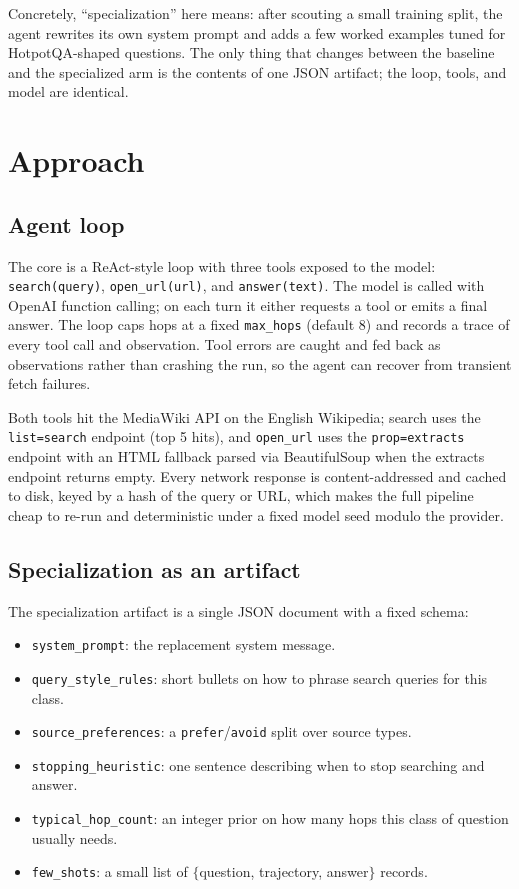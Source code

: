 \documentclass[11pt,a4paper]{article}
\begin{document}
Concretely, ``specialization'' here means: after scouting a small training
split, the agent rewrites its own system prompt and adds a few worked
examples tuned for HotpotQA-shaped questions. The only thing that changes
between the baseline and the specialized arm is the contents of one JSON
artifact; the loop, tools, and model are identical.

\section{Approach}

\subsection{Agent loop}

The core is a ReAct-style loop with three tools exposed to the model:
\texttt{search(query)}, \texttt{open\_url(url)}, and \texttt{answer(text)}.
The model is called with OpenAI function calling; on each turn it either
requests a tool or emits a final answer. The loop caps hops at a fixed
\texttt{max\_hops} (default 8) and records a trace of every tool call and
observation. Tool errors are caught and fed back as observations rather
than crashing the run, so the agent can recover from transient fetch
failures.

Both tools hit the MediaWiki API on the English Wikipedia; search uses the
\texttt{list=search} endpoint (top 5 hits), and \texttt{open\_url} uses
the \texttt{prop=extracts} endpoint with an HTML fallback parsed via
BeautifulSoup when the extracts endpoint returns empty. Every network
response is content-addressed and cached to disk, keyed by a hash of the
query or URL, which makes the full pipeline cheap to re-run and
deterministic under a fixed model seed modulo the provider.

\subsection{Specialization as an artifact}

The specialization artifact is a single JSON document with a fixed schema:

\begin{itemize}[leftmargin=*]
    \item \texttt{system\_prompt}: the replacement system message.
    \item \texttt{query\_style\_rules}: short bullets on how to phrase
          search queries for this class.
    \item \texttt{source\_preferences}: a \texttt{prefer}/\texttt{avoid}
          split over source types.
    \item \texttt{stopping\_heuristic}: one sentence describing when to
          stop searching and answer.
    \item \texttt{typical\_hop\_count}: an integer prior on how many
          hops this class of question usually needs.
    \item \texttt{few\_shots}: a small list of $\{$question, trajectory,
          answer$\}$ records.
\end{itemize}
\end{document}
